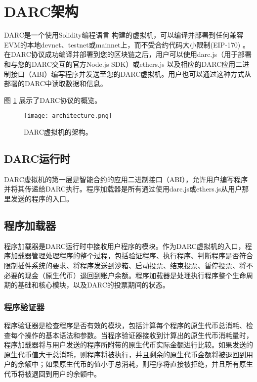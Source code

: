\documentclass[main.tex]{subfiles}
\begin{document}
\section{DARC架构}

DARC是一个使用Solidity编程语言 \cite{soliditylangSolidityx2014} 构建的虚拟机，可以编译并部署到任何兼容EVM的本地devnet、testnet或mainnet上，而不受合约代码大小限制(EIP-170) \cite{ethereumEIP170Contract}。在DARC协议成功编译并部署到您的区块链之后，用户可以使用darc.js（用于部署和与您的DARC交互的官方Node.js SDK）或ethers.js \cite{ethersDocumentation} 以及相应的DARC应用二进制接口（ABI）编写程序并发送至您的DARC虚拟机。用户也可以通过这种方式从部署的DARC中读取数据和信息。

图 \ref{fig:architecture} 展示了DARC协议的概览。

\begin{figure}
\centering
\texttt{[image: architecture.png]}
\caption{\label{fig:architecture}DARC虚拟机的架构。}
\end{figure}

\subsection{DARC运行时}

DARC虚拟机的第一层是智能合约的应用二进制接口（ABI），允许用户编写程序并将其传递给DARC执行。程序加载器是所有通过使用darc.js或ethers.js从用户那里发送的程序的入口。

\subsection{程序加载器}

程序加载器是DARC运行时中接收用户程序的模块。作为DARC虚拟机的入口，程序加载器管理处理程序的整个过程，包括验证程序、执行程序、判断程序是否符合限制插件系统的要求、将程序发送到沙箱、启动投票、结束投票、暂停投票、将不必要的现金（原生代币）退回到账户余额。程序加载器是处理执行程序整个生命周期的基础和核心模块，以及DARC的投票期间的状态。

\subsubsection{程序验证器}

程序验证器是检查程序是否有效的模块，包括计算每个程序的原生代币总消耗、检查每个操作的基本语法和参数。当程序验证器接收到计算出的原生代币消耗量时，程序加载器将与用户发送的程序所附带的原生代币实际金额进行比较。如果发送的原生代币值大于总消耗，则程序将被执行，并且剩余的原生代币金额将被退回到用户的余额中；如果原生代币的值小于总消耗，则程序将直接被拒绝，并且所有原生代币将被退回到用户的余额中。
\end{document}
